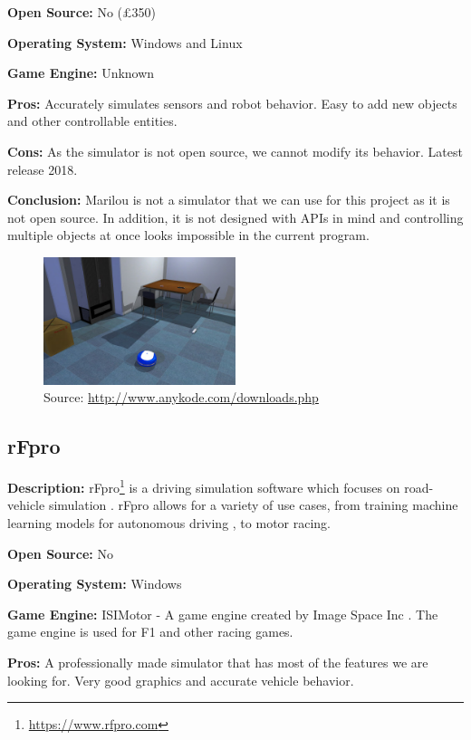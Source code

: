 \textbf{Open Source:} No (£350)

\textbf{Operating System:} Windows and Linux

\textbf{Game Engine:} Unknown

\textbf{Pros:} Accurately simulates sensors and robot behavior. Easy to add new objects and other controllable entities. 

\textbf{Cons:} As the simulator is not open source, we cannot modify its behavior. Latest release 2018.

\textbf{Conclusion:} Marilou is not a simulator that we can use for this project as it is not open source. In addition, it is not designed with APIs in mind and controlling multiple objects at once looks impossible in the current program. 

\begin{figure}[H]
    \centering
    \includegraphics[width=0.5\textwidth]{Simulators/Marilou.jpg}
    \caption{Source: \url{http://www.anykode.com/downloads.php}}
\end{figure}


\subsection{rFpro}
\textbf{Description:} rFpro\footnote{\url{https://www.rfpro.com}} is a driving simulation software which focuses on road-vehicle simulation \cite{rFpro_Web}. rFpro allows for a variety of use cases, from training machine learning models for autonomous driving \cite{rFpro_ML}, to motor racing.

\textbf{Open Source:} No

\textbf{Operating System:} Windows

\textbf{Game Engine:} ISIMotor - A game engine created by Image Space Inc \cite{ISIMotor}. The game engine is used for F1 and other racing games.

\textbf{Pros:} A professionally made simulator that has most of the features we are looking for. Very good graphics and accurate vehicle behavior. 

